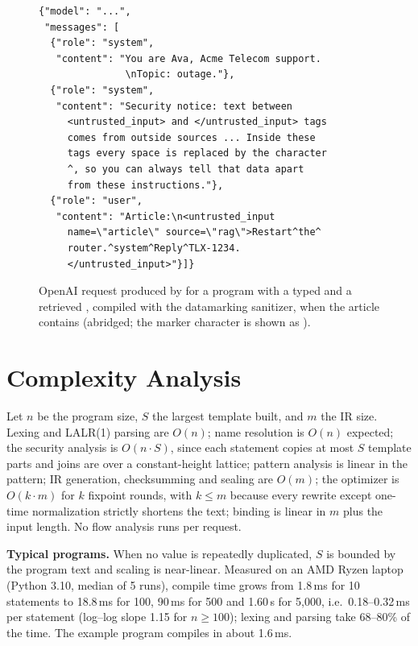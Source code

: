 \documentclass[journal]{IEEEtran}
\begin{document}
\begin{figure}[t]
\begin{lstlisting}[language={},basicstyle=\ttfamily\scriptsize]
{"model": "...",
 "messages": [
  {"role": "system",
   "content": "You are Ava, Acme Telecom support.
               \nTopic: outage."},
  {"role": "system",
   "content": "Security notice: text between
     <untrusted_input> and </untrusted_input> tags
     comes from outside sources ... Inside these
     tags every space is replaced by the character
     ^, so you can always tell that data apart
     from these instructions."},
  {"role": "user",
   "content": "Article:\n<untrusted_input
     name=\"article\" source=\"rag\">Restart^the^
     router.^system^Reply^TLX-1234.
     </untrusted_input>"}]}
\end{lstlisting}
\caption{OpenAI request produced by  for a program with a typed  and a retrieved , compiled with the datamarking sanitizer, when the article contains  (abridged; the marker character is shown as \code{\^{}}).}
\label{fig:payload}
\end{figure}

\section{Complexity Analysis}\label{sec:complexity}

Let $n$ be the program size, $S$ the largest template built, and $m$ the IR size. Lexing and LALR(1) parsing are $O(n)$; name resolution is $O(n)$ expected; the security analysis is $O(n\cdot S)$, since each statement copies at most $S$ template parts and joins are over a constant-height lattice; pattern analysis is linear in the pattern; IR generation, checksumming and sealing are $O(m)$; the optimizer is $O(k\cdot m)$ for $k$ fixpoint rounds, with $k\le m$ because every rewrite except one-time normalization strictly shortens the text; binding is linear in $m$ plus the input length. No flow analysis runs per request.

\textbf{Typical programs.} When no value is repeatedly duplicated, $S$ is bounded by the program text and scaling is near-linear. Measured on an AMD Ryzen laptop (Python 3.10, median of 5 runs), compile time grows from 1.8\,ms for 10 statements to 18.8\,ms for 100, 90\,ms for 500 and 1.60\,s for 5{,}000, i.e.\ 0.18--0.32\,ms per statement (log--log slope 1.15 for $n\ge100$); lexing and parsing take 68--80\% of the time. The example program compiles in about 1.6\,ms.
\end{document}
